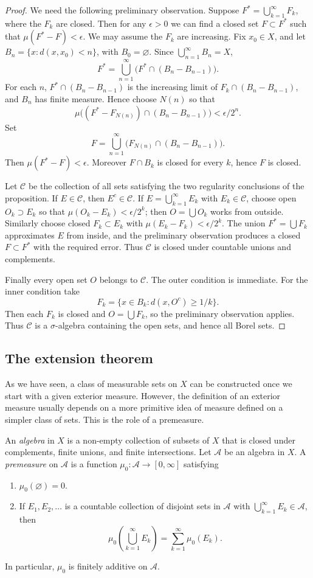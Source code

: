 \documentclass[11pt,openany]{book}
\begin{document}
\begin{proof}
We need the following preliminary observation. Suppose $F^*=\bigcup_{k=1}^{\infty}F_k$, where the $F_k$ are closed. Then for any $\epsilon>0$ we can find a closed set $F\subset F^*$ such that $\mu(F^*-F)<\epsilon$. We may assume the $F_k$ are increasing. Fix $x_0\in X$, and let $B_n=\{x:d(x,x_0)<n\}$, with $B_0=\varnothing$. Since $\bigcup_{n=1}^{\infty}B_n=X$,
\[
F^*=\bigcup_{n=1}^{\infty}\bigl(F^*\cap(B_n-B_{n-1})\bigr).
\]
For each $n$, $F^*\cap(B_n-B_{n-1})$ is the increasing limit of $F_k\cap(B_n-B_{n-1})$, and $B_n$ has finite measure. Hence choose $N(n)$ so that
\[
\mu\bigl((F^*-F_{N(n)})\cap(B_n-B_{n-1})\bigr)<\epsilon/2^n.
\]
Set
\[
F=\bigcup_{n=1}^{\infty}\bigl(F_{N(n)}\cap(B_n-B_{n-1})\bigr).
\]
Then $\mu(F^*-F)<\epsilon$. Moreover $F\cap B_k$ is closed for every $k$, hence $F$ is closed.

Let $\mathcal C$ be the collection of all sets satisfying the two regularity conclusions of the proposition. If $E\in\mathcal C$, then $E^c\in\mathcal C$. If $E=\bigcup_{k=1}^{\infty}E_k$ with $E_k\in\mathcal C$, choose open $O_k\supset E_k$ so that $\mu(O_k-E_k)<\epsilon/2^k$; then $O=\bigcup O_k$ works from outside. Similarly choose closed $F_k\subset E_k$ with $\mu(E_k-F_k)<\epsilon/2^k$. The union $F^*=\bigcup F_k$ approximates $E$ from inside, and the preliminary observation produces a closed $F\subset F^*$ with the required error. Thus $\mathcal C$ is closed under countable unions and complements.

Finally every open set $O$ belongs to $\mathcal C$. The outer condition is immediate. For the inner condition take
\[
F_k=\{x\in B_k:d(x,O^c)\geq1/k\}.
\]
Then each $F_k$ is closed and $O=\bigcup F_k$, so the preliminary observation applies. Thus $\mathcal C$ is a $\sigma$-algebra containing the open sets, and hence all Borel sets.
\end{proof}

\subsection{The extension theorem}

As we have seen, a class of measurable sets on $X$ can be constructed once we start with a given exterior measure. However, the definition of an exterior measure usually depends on a more primitive idea of measure defined on a simpler class of sets. This is the role of a premeasure.

An \emph{algebra} in $X$ is a non-empty collection of subsets of $X$ that is closed under complements, finite unions, and finite intersections. Let $\mathcal A$ be an algebra in $X$. A \emph{premeasure} on $\mathcal A$ is a function $\mu_0:\mathcal A\to[0,\infty]$ satisfying
\begin{enumerate}
\item[(i)] $\mu_0(\varnothing)=0$.
\item[(ii)] If $E_1,E_2,\ldots$ is a countable collection of disjoint sets in $\mathcal A$ with $\bigcup_{k=1}^{\infty}E_k\in\mathcal A$, then
\[
\mu_0\left(\bigcup_{k=1}^{\infty}E_k\right)=\sum_{k=1}^{\infty}\mu_0(E_k).
\]
\end{enumerate}
In particular, $\mu_0$ is finitely additive on $\mathcal A$.
\end{document}
